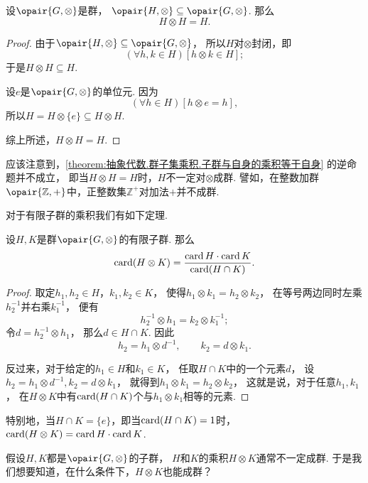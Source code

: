 \begin{proposition}\label{theorem:抽象代数.群子集乘积.子群与自身的乘积等于自身}
设\(\opair{G,\otimes}\)是群，
\(\opair{H,\otimes} \subseteq \opair{G,\otimes}\).
那么\[
	H \otimes H = H.
\]
\begin{proof}
由于\(\opair{H,\otimes}\subseteq\opair{G,\otimes}\)，
所以\(H\)对\(\otimes\)封闭，即\[
	(\forall h,k \in H)
	[h \otimes k \in H];
\]
于是\(H \otimes H \subseteq H\).

设\(e\)是\(\opair{G,\otimes}\)的单位元.
因为\[
	(\forall h \in H)
	[h \otimes e = h],
\]
所以\(H = H \otimes \{e\} \subseteq H \otimes H\).

综上所述，\(H \otimes H = H\).
\end{proof}
\end{proposition}

应该注意到，\cref{theorem:抽象代数.群子集乘积.子群与自身的乘积等于自身} 的逆命题并不成立，
即当\(H \otimes H = H\)时，\(H\)不一定对\(\otimes\)成群.
譬如，在整数加群\(\opair{\mathbb{Z},+}\)中，正整数集\(\mathbb{Z}^+\)对加法\(+\)并不成群.

对于有限子群的乘积我们有如下定理.
\begin{theorem}
设\(H,K\)是群\(\opair{G,\otimes}\)的有限子群.
那么\[
	\operatorname{card}(H \otimes K)
	= \frac{\operatorname{card} H \cdot \operatorname{card} K}{\operatorname{card}(H \cap K)}.
\]
\begin{proof}
取定\(h_1,h_2 \in H\)，\(k_1,k_2 \in K\)，
使得\(h_1 \otimes k_1 = h_2 \otimes k_2\)，
在等号两边同时左乘\(h_2^{-1}\)并右乘\(k_1^{-1}\)，
便有\[
	h_2^{-1} \otimes h_1 = k_2 \otimes k_1^{-1};
\]
令\(d = h_2^{-1} \otimes h_1\)，
那么\(d \in H \cap K\).
因此\[
	h_2 = h_1 \otimes d^{-1}, \qquad
	k_2 = d \otimes k_1.
\]

反过来，对于给定的\(h_1 \in H\)和\(k_1 \in K\)，
任取\(H \cap K\)中的一个元素\(d\)，
设\(h_2 = h_1 \otimes d^{-1},
k_2 = d \otimes k_1\)，
就得到\(h_1 \otimes k_1 = h_2 \otimes k_2\)，
这就是说，对于任意\(h_1,k_1\)，
在\(H \otimes K\)中有\(\operatorname{card}(H \cap K)\)个与\(h_1 \otimes k_1\)相等的元素.
\end{proof}
\end{theorem}

特别地，当\(H \cap K = \{e\}\)，即当\(\operatorname{card}(H \cap K) = 1\)时，
\(\operatorname{card}(H \otimes K) = \operatorname{card} H \cdot \operatorname{card} K\).

假设\(H,K\)都是\(\opair{G,\otimes}\)的子群，
\(H\)和\(K\)的乘积\(H \otimes K\)通常不一定成群.
于是我们想要知道，在什么条件下，\(H \otimes K\)也能成群？

